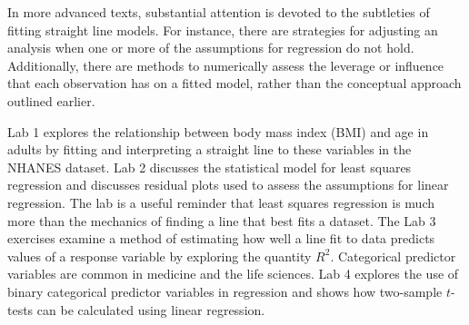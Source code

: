 In more advanced texts, substantial attention is devoted to the subtleties of fitting straight line models. For instance, there are strategies for adjusting an analysis when one or more of the assumptions for regression do not hold. Additionally, there are methods to numerically assess the leverage or influence that each observation has on a fitted model, rather than the conceptual approach outlined earlier.

Lab 1 explores the relationship between body mass index (BMI) and age in adults by fitting and interpreting a straight line to these variables in the NHANES dataset.  Lab 2 discusses the statistical model for least squares regression and discusses residual plots used to assess the assumptions for linear regression.  The lab is a useful reminder that least squares regression is much more than the mechanics of finding a line that best fits a dataset.  The Lab 3 exercises examine a method of estimating how well a line fit to data predicts values of a response variable by exploring the quantity $R^2$.  Categorical predictor variables are common in medicine and the life sciences.  Lab 4 explores the use of binary categorical predictor variables in regression and shows how two-sample $t$-tests can be calculated using linear regression.

